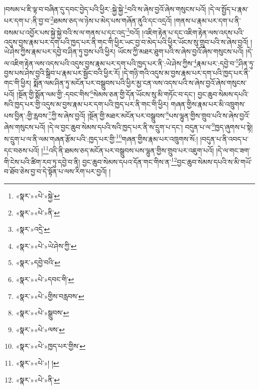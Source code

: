 །བསམ་པ་ཇི་ལྟ་བ་བཞིན་དུ་དབང་བྱེད་པའི་ཕྱིར་:སྐྱེ་སྐྱེ་\footnote{«སྣར་»«པེ་»སྐྱེ་}བའི་ས་ཞེས་བྱའོ་ཞེས་གསུངས་པའོ། །དེ་ལ་སྤྱོད་པ་རྣམ་པར་དག་པ་:ནི་བྱ་བ་\footnote{«སྣར་»«པེ་»ནི་}ཐམས་ཅད་ལ་ཉེས་པ་མེད་པས་གཞོན་ནུའི་དང་འདྲའོ། །གནས་པ་རྣམ་པར་དག་པ་ནི་བསམ་པ་འབྱོར་པས་སྐྱེ་སྐྱེ་བའི་ས་ལ་གནས་པ་དང་འདྲ་\footnote{«སྣར་»འདྲེ་}བའོ། །འཇིག་རྟེན་པ་དང་འཇིག་རྟེན་ལས་འདས་པའི་འདུས་བྱས་རྣམ་པར་དག་པའི་ཁྱད་པར་ནི་གང་གི་ཕྱིར་ཡང་བྱ་བ་མེད་པའི་ཕྱིར་ཡོངས་སུ་གྲུབ་པའི་ས་ཞེས་བྱའོ། །ཡེ་ཤེས་ཀྱིས་རྣམ་པར་དབྱེ་བ་ཤིན་ཏུ་བྱས་པའི་ཕྱིར། ཡོངས་ཀྱི་མཐར་ཐུག་པའི་ས་ཞེས་བྱའོ་ཞེས་གསུངས་པའོ། །དེ་ལ་འཇིག་རྟེན་ལས་འདས་པའི་འདུས་བྱས་རྣམ་པར་དག་པའི་ཁྱད་པར་ནི་:ཡེ་ཤེས་ཀྱིས་\footnote{«སྣར་»«པེ་»ཡེ་ཤེས་ཀྱི་}རྣམ་པར་:དབྱེ་བ་\footnote{«སྣར་»དབྱེ་བའི་}ཤིན་ཏུ་བྱས་པས་ཤེས་བྱའི་སྒྲིབ་པ་རྣམ་པར་སྦྱོང་བའི་ཕྱིར་རོ། །དེ་གཉི་གའི་འདུས་མ་བྱས་རྣམ་པར་དག་པའི་ཁྱད་པར་ནི་གང་གི་ཕྱིར། སྨོན་ལམ་ཤིན་ཏུ་མངོན་པར་བསྒྲུབས་པའི་ཕྱིར་མྱ་ངན་ལས་འདས་པའི་ས་ཞེས་བྱའོ་ཞེས་གསུངས་པའོ། །སྔོན་གྱི་སྨོན་ལམ་གྱི་:དབང་གིས་\footnote{«སྣར་»«པེ་»དབང་གི་}སེམས་ཅན་གྱི་དོན་ཡོངས་སུ་མི་གཏོང་བ་དང་། བྱང་ཆུབ་སེམས་དཔའི་སའི་ཁྱད་པར་གྱི་འདུས་མ་བྱས་རྣམ་པར་དག་པའི་ཁྱད་པར་ནི་གང་གི་ཕྱིར། གཞན་གྱིས་རྣམ་པར་མི་འཁྲུགས་པས་བྱིན་:གྱི་རླབས་\footnote{«སྣར་»«པེ་»གྱིས་བརླབས་}ཀྱི་ས་ཞེས་བྱའོ། །སྔོན་གྱི་མཐར་མངོན་པར་བསྒྲུབས་\footnote{«སྣར་»«པེ་»སྒྲུབས་}པས་ལྷུན་གྱིས་གྲུབ་པའི་ས་ཞེས་བྱའོ་ཞེས་གསུངས་པའོ། །དེ་ལ་བྱང་ཆུབ་སེམས་དཔའི་སའི་ཁྱད་པར་ནི་ས་དྲུག་པ་དང་། བདུན་པ་ལ་\footnote{«སྣར་»«པེ་»ལས་}ཁྱད་ཞུགས་པ་སྟེ། ས་དྲུག་པ་ལ་ནི་ལམ་གཞན་རྩོམ་པའི་:ཁྱད་པར་གྱི་\footnote{«སྣར་»«པེ་»ཁྱད་པར་གྱིས་}གཞན་གྱིས་རྣམ་པར་འཁྲུགས་སོ:། །བདུན་པ་ནི་འབད་པ་དང་བཅས་པའོ། །\footnote{«སྣར་»«པེ་»། །}འདི་ནི་ཐམས་ཅད་མངོན་པར་བསྒྲུབས་པས་ལྷུན་གྱིས་གྲུབ་པར་འཇུག་པའོ། །དེ་ལ་གང་ཟག་གི་ངེས་པའི་ཚིག་རབ་ཏུ་དབྱེ་བ་ནི། བྱང་ཆུབ་སེམས་དཔའ་དོན་གང་གིས་ན་\footnote{«སྣར་»«པེ་»ནི་}བྱང་ཆུབ་སེམས་དཔའི་ས་མི་གཡོ་བ་ཐོབ་ཅེས་བྱ་བ་དེ་སྟོན་པ་ལས་རིག་པར་བྱའོ། །
